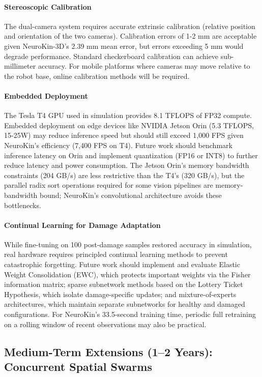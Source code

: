 ﻿\documentclass[12pt,a4paper,oneside]{report}
\begin{document}
\paragraph{Stereoscopic Calibration}
The dual-camera system requires accurate extrinsic calibration (relative position and orientation of the two cameras). Calibration errors of 1-2 mm are acceptable given NeuroKin-3D's 2.39 mm mean error, but errors exceeding 5 mm would degrade performance. Standard checkerboard calibration can achieve sub-millimeter accuracy. For mobile platforms where cameras may move relative to the robot base, online calibration methods will be required.

\paragraph{Embedded Deployment}
The Tesla T4 GPU used in simulation provides 8.1 TFLOPS of FP32 compute. Embedded deployment on edge devices like NVIDIA Jetson Orin (5.3 TFLOPS, 15-25W) may reduce inference speed but should still exceed 1,000 FPS given NeuroKin's efficiency (7,400 FPS on T4). Future work should benchmark inference latency on Orin and implement quantization (FP16 or INT8) to further reduce latency and power consumption. The Jetson Orin's memory bandwidth constraints (204 GB/s) are less restrictive than the T4's (320 GB/s), but the parallel radix sort operations required for some vision pipelines are memory-bandwidth bound; NeuroKin's convolutional architecture avoids these bottlenecks.

\paragraph{Continual Learning for Damage Adaptation}
While fine-tuning on 100 post-damage samples restored accuracy in simulation, real hardware requires principled continual learning methods to prevent catastrophic forgetting. Future work should implement and evaluate Elastic Weight Consolidation (EWC), which protects important weights via the Fisher information matrix; sparse subnetwork methods based on the Lottery Ticket Hypothesis, which isolate damage-specific updates; and mixture-of-experts architectures, which maintain separate subnetworks for healthy and damaged configurations. For NeuroKin's 33.5-second training time, periodic full retraining on a rolling window of recent observations may also be practical.

\subsection{Medium-Term Extensions (1--2 Years): Concurrent Spatial Swarms}
\end{document}
